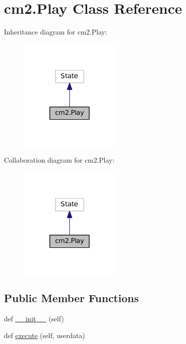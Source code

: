 \hypertarget{classcm2_1_1Play}{}\section{cm2.\+Play Class Reference}
\label{classcm2_1_1Play}


Inheritance diagram for cm2.\+Play\+:\nopagebreak
\begin{figure}[H]
\begin{center}
\leavevmode
\includegraphics[width=140pt]{classcm2_1_1Play__inherit__graph}
\end{center}
\end{figure}


Collaboration diagram for cm2.\+Play\+:\nopagebreak
\begin{figure}[H]
\begin{center}
\leavevmode
\includegraphics[width=140pt]{classcm2_1_1Play__coll__graph}
\end{center}
\end{figure}
\subsection*{Public Member Functions}
\begin{DoxyCompactItemize}
\item 
def \hyperlink{classcm2_1_1Play_adc40c5ca055ba2df960e167dc9e1114d}{\+\_\+\+\_\+init\+\_\+\+\_\+} (self)
\item 
def \hyperlink{classcm2_1_1Play_ab7167a091bb50aa54dec773a50d2f394}{execute} (self, userdata)
\end{DoxyCompactItemize}
